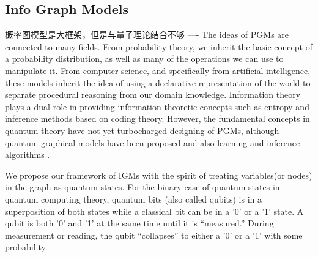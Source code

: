 \documentclass[10pt,onecolumn,letterpaper]{article}
\begin{document}
\begin{CJK*}{UTF8}{gbsn}

\section{Info Graph Models}

概率图模型是大框架，但是与量子理论结合不够 ----
The ideas of PGMs are connected to many fields. From probability theory, we inherit the basic concept of a probability distribution, as well as many of the operations we can use to manipulate it. From computer science, and specifically from artificial intelligence, these models inherit the idea of using a declarative representation of the world to separate procedural reasoning from our domain knowledge. Information theory plays a dual role in providing information-theoretic concepts such as entropy and inference methods based on coding theory. However, the fundamental concepts in quantum theory have not yet turbocharged designing of PGMs, although quantum graphical models have been proposed and also learning and inference algorithms \cite{srinivasan2018learning, leifer2008quantum, jouneghani2013review}. 

We propose our framework of IGMs with the spirit of treating variables(or nodes) in the graph as quantum states. For the binary case of quantum states in quantum computing theory, quantum bits (also called qubits) is in a superposition of both states while a classical bit can be in a '0' or a '1' state. A qubit is both '0' and '1' at the same time until it is “measured.” During measurement or reading, the qubit “collapses” to either a '0' or a '1' with some probability.



\end{CJK*}
\end{document}

